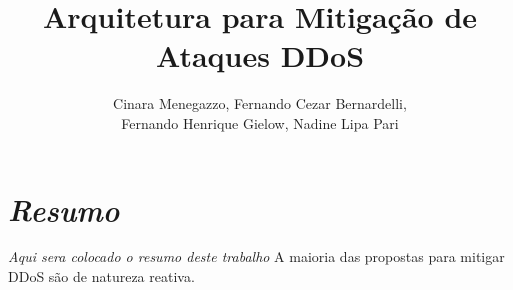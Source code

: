 \documentclass[a4paper, 12pt]{article}
\begin{document}
\title{Arquitetura para Mitigação de Ataques DDoS}

\author{
Cinara Menegazzo,
Fernando Cezar Bernardelli, \\
Fernando Henrique Gielow,
Nadine Lipa Pari
}
   

   
\address{Departamento de Informática -- Universidade Federal do Paraná\\
  Caixa Postal 19.081 -- 81.531-980 -- Curitiba -- PR -- Brasil
}     

\maketitle


\section*{\emph{Resumo}}
\emph{Aqui sera colocado o resumo deste trabalho}
A maioria das propostas para mitigar DDoS são de natureza reativa.

%
%
%
%
\end{document}
